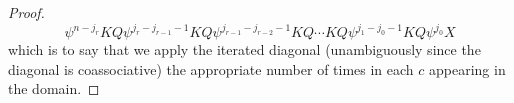 \documentclass[11pt]{amsart}
\theoremstyle{plain}
\newcommand{\dupdown}[2]{D_{\smash{#1}}}
\begin{document}
\begin{proof}
\[\psi^{n-j_r}KQ\psi^{j_r-j_{r-1}-1}KQ\psi^{j_{r-1}-j_{r-2}-1}KQ\cdots KQ\psi^{j_{1}-j_0-1}KQ\psi^{j_0}X\]
which is to say that we apply the iterated diagonal (unambiguously since the diagonal is coassociative) the appropriate number of times in each $c$ appearing in the domain.
\end{proof}
\end{document}
